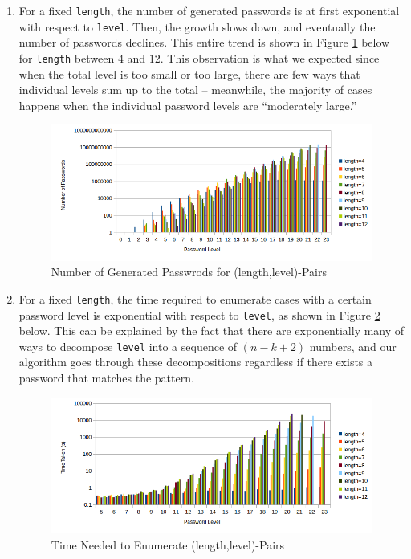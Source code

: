 \documentclass{article} %
\theoremstyle{definition}
\theoremstyle{theorem}
\theoremstyle{remark}
\theoremstyle{remark}
\begin{document}
\begin{enumerate}
    \item For a fixed \texttt{length}, the number of generated passwords is at first exponential with respect to \texttt{level}. Then, the growth slows down, and eventually the number of passwords declines. This entire trend is shown in Figure \ref{fig:passnum} below for \texttt{length} between $4$ and $12$. This observation is what we expected since when the total level is too small or too large, there are few ways that individual levels sum up to the total -- meanwhile, the majority of cases happens when the individual password levels are ``moderately large.''
    
        \begin{figure}[!htbp]
        \begin{center}
            \includegraphics[width=.85\textwidth]{diag/passwd-count.png}
        \end{center}
        \vspace{-15pt}
        \caption{Number of Generated Passwrods for (length,level)-Pairs}
        \label{fig:passnum}
        \end{figure}
    
    \item For a fixed \texttt{length}, the time required to enumerate cases with a certain password level is exponential with respect to \texttt{level}, as shown in Figure \ref{fig:passtime} below. This can be explained by the fact that there are exponentially many of ways to decompose \texttt{level} into a sequence of $(n-k+2)$ numbers, and our algorithm goes through these decompositions regardless if there exists a password  that matches the pattern.

        \begin{figure}[!htbp]
        \begin{center}
            \includegraphics[width=.85\textwidth]{diag/passwd-time.png}
        \end{center}
        \vspace{-15pt}
        \caption{Time Needed to Enumerate (length,level)-Pairs}
        \label{fig:passtime}
        \end{figure}
    

\end{enumerate}
\end{document}

